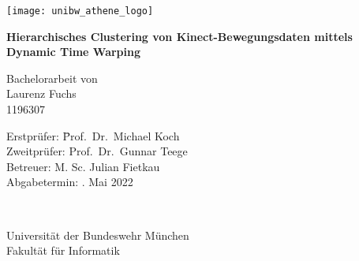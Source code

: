 \thispagestyle{empty}
\cleardoublepage

\thispagestyle{empty}

\begin{center}

\vspace*{1cm}

\texttt{[image: unibw\_athene\_logo]}

\vspace{1.5cm}
{\Huge
\textbf{Hierarchisches Clustering von Kinect-Bewegungsdaten mittels Dynamic Time Warping}\\
}
\vspace{1.5cm}


{\Large
Bachelorarbeit von\\
Laurenz Fuchs\\
1196307\\
}
\vspace{1cm}

\parbox{1cm}{
\begin{large}
\begin{tabbing}
Erstprüfer: \hspace{.7cm} \=Prof.\ Dr.\ Michael Koch\\[2mm]
Zweitprüfer: \>Prof.\ Dr.\ Gunnar Teege\\[2mm]
Betreuer:
\>M. Sc. Julian Fietkau\\[7mm]
Abgabetermin: . Mai 2022\\
\end{tabbing}
\end{large}}\\
\vspace{5mm}

\vfill

{\Large
Universität der Bundeswehr München\\
Fakultät für Informatik\\
}

\end{center}
